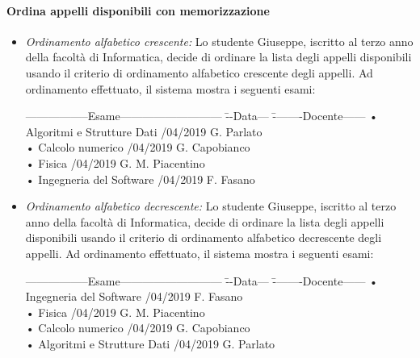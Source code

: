 \paragraph{Ordina appelli disponibili con memorizzazione}
\begin{itemize}
	\item \textit{Ordinamento alfabetico crescente:}
	Lo studente Giuseppe, iscritto al terzo anno della facoltà di Informatica, decide di ordinare la lista degli appelli disponibili usando il criterio di ordinamento alfabetico crescente degli appelli. Ad ordinamento effettuato, il sistema mostra i seguenti esami:
	\begin{tabbing}
		\hspace{1cm}-----------------Esame--------------------------- \= --Data--- \= --------Docente------ \kill
		\hspace{1cm} • Algoritmi e Strutture Dati /04/2019 \> \hspace{1cm} G. Parlato \\
		\hspace{1cm} • Calcolo numerico /04/2019  \> \hspace{1cm} G. Capobianco \\
		\hspace{1cm} • Fisica /04/2019 \> \hspace{1cm} G. M. Piacentino  \\
		\hspace{1cm} • Ingegneria del Software /04/2019   \> \hspace{1cm} F. Fasano \\
	\end{tabbing}
	
	\item \textit{Ordinamento alfabetico decrescente:}
	Lo studente Giuseppe, iscritto al terzo anno della facoltà di Informatica, decide di ordinare la lista degli appelli disponibili usando il criterio di ordinamento alfabetico decrescente degli appelli. Ad ordinamento effettuato, il sistema mostra i seguenti esami:
	\begin{tabbing}
		\hspace{1cm}-----------------Esame--------------------------- \= --Data--- \= --------Docente------ \kill
		\hspace{1cm} • Ingegneria del Software /04/2019   \> \hspace{1cm} F. Fasano \\
		\hspace{1cm} • Fisica /04/2019 \> \hspace{1cm} G. M. Piacentino  \\
		\hspace{1cm} • Calcolo numerico /04/2019  \> \hspace{1cm} G. Capobianco \\
		\hspace{1cm} • Algoritmi e Strutture Dati /04/2019 \> \hspace{1cm} G. Parlato \\		
	\end{tabbing}
	

\end{itemize}
